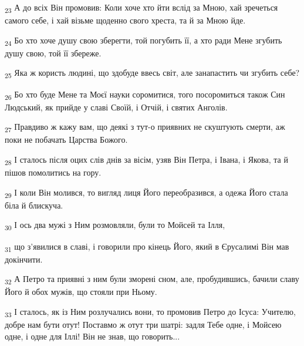\begin{tcolorbox}
\textsubscript{23} А до всіх Він промовив: Коли хоче хто йти вслід за Мною, хай зречеться самого себе, і хай візьме щоденно свого хреста, та й за Мною йде.
\end{tcolorbox}
\begin{tcolorbox}
\textsubscript{24} Бо хто хоче душу свою зберегти, той погубить її, а хто ради Мене згубить душу свою, той її збереже.
\end{tcolorbox}
\begin{tcolorbox}
\textsubscript{25} Яка ж користь людині, що здобуде ввесь світ, але занапастить чи згубить себе?
\end{tcolorbox}
\begin{tcolorbox}
\textsubscript{26} Бо хто буде Мене та Моєї науки соромитися, того посоромиться також Син Людський, як прийде у славі Своїй, і Отчій, і святих Анголів.
\end{tcolorbox}
\begin{tcolorbox}
\textsubscript{27} Правдиво ж кажу вам, що деякі з тут-о приявних не скуштують смерти, аж поки не побачать Царства Божого.
\end{tcolorbox}
\begin{tcolorbox}
\textsubscript{28} І сталось після оцих слів днів за вісім, узяв Він Петра, і Івана, і Якова, та й пішов помолитись на гору.
\end{tcolorbox}
\begin{tcolorbox}
\textsubscript{29} І коли Він молився, то вигляд лиця Його переобразився, а одежа Його стала біла й блискуча.
\end{tcolorbox}
\begin{tcolorbox}
\textsubscript{30} І ось два мужі з Ним розмовляли, були то Мойсей та Ілля,
\end{tcolorbox}
\begin{tcolorbox}
\textsubscript{31} що з'явилися в славі, і говорили про кінець Його, який в Єрусалимі Він мав докінчити.
\end{tcolorbox}
\begin{tcolorbox}
\textsubscript{32} А Петро та приявні з ним були зморені сном, але, пробудившись, бачили славу Його й обох мужів, що стояли при Ньому.
\end{tcolorbox}
\begin{tcolorbox}
\textsubscript{33} І сталось, як із Ним розлучались вони, то промовив Петро до Ісуса: Учителю, добре нам бути отут! Поставмо ж отут три шатрі: задля Тебе одне, і Мойсею одне, і одне для Іллі! Він не знав, що говорить...
\end{tcolorbox}
